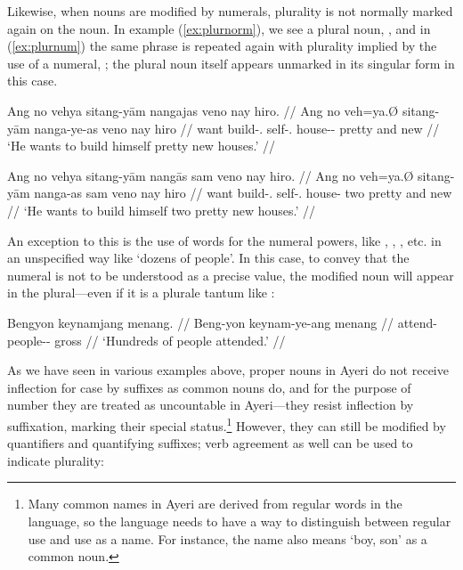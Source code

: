 \xe

Likewise, when nouns are modified by numerals, plurality is not
normally marked again on the noun. In example (\ref{ex:plurnorm}), we see a
plural noun, , and in (\ref{ex:plurnum}) the same phrase
is repeated again with plurality implied by the use of a numeral,
; the plural noun itself appears unmarked in its singular 
form in this case.

\pex
\a\label{ex:plurnorm}\begingl
	\gla Ang no vehya sitang-yām nangajas veno nay hiro. //
	\glb Ang no veh=ya.Ø sitang-yām nanga-ye-as veno nay hiro //
	\glc \AgtT{} want build-\TsgM.\Top{} self-\TsgM{}.\Dat{} 
		house-\Pl{}-\Parg{} pretty and new //
	\glft `He wants to build himself pretty new houses.' //
\endgl

\a\label{ex:plurnum}\begingl
	\gla Ang no vehya sitang-yām nangās sam veno nay hiro. //
	\glb Ang no veh=ya.Ø sitang-yām nanga-as sam veno nay hiro //
	\glc \AgtT{} want build-\TsgM.\Top{} self-\TsgM{}.\Dat{} house-\Parg{} 
		two pretty and new //
	\glft `He wants to build himself two pretty new houses.' //
\endgl

\xe

An exception to this is the use of words for the numeral powers, like
, ,
, etc. in an unspecified way like `dozens 
of people'. In this case, to convey that the numeral is not to be understood as
a precise value, the modified noun will appear in the plural---even if it is a
plurale tantum like :

\ex\begingl
	\gla Bengyon keynamjang menang. //
	\glb Beng-yon keynam-ye-ang menang //
	\glc attend-\TsgN{} people-\Pl{}-\Aarg{} gross //
	\glft `Hundreds of people attended.' //
\endgl\xe

%
As we have seen in various examples above, proper nouns in Ayeri do not 
receive inflection for case by suffixes as common nouns do, and for the 
purpose of number they are treated as uncountable in Ayeri---they resist 
inflection by suffixation, marking their special status.\footnote{Many common 
names in Ayeri are derived from regular words in the language, so the language 
needs to have a way to distinguish between regular use and use as a name. For 
instance, the name  also means `boy, son' as a common noun.} 
However, they can still be modified by quantifiers and quantifying suffixes; 
verb agreement as well can be used to indicate plurality:

